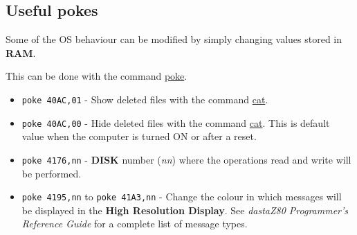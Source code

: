     \subsection{Useful pokes}

    Some of the OS behaviour can be modified by simply changing values stored in
    \textbf{RAM}.
    
    This can be done with the command \hyperref[cmd:poke]{poke}.

    \begin{itemize}
        \item \texttt{poke 40AC,01} - Show deleted files with the command
            \hyperref[cmd:cat]{cat}.
        \item \texttt{poke 40AC,00} - Hide deleted files with the command
            \hyperref[cmd:cat]{cat}. This is default value when the computer is
            turned ON or after a reset.
        \item \texttt{poke 4176,nn} - \textbf{DISK} number (\textit{nn})
            where the operations read and write will be performed.
        \item \texttt{poke 4195,nn} to \texttt{poke 41A3,nn} - Change the 
            colour in which messages will be displayed in the \textbf{High
            Resolution Display}. See \textit{dastaZ80 Programmer's Reference
            Guide}\cite{dastaz80progref} for a complete list of message types.
    \end{itemize}

